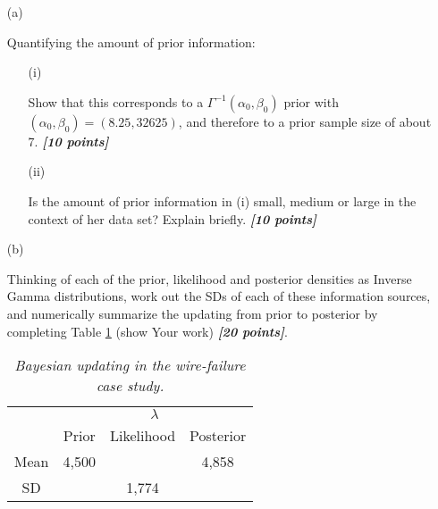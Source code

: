 \documentclass[12pt]{article}
\newcommand{\bi}[1]{\b{\i{#1}}}
\renewcommand{\b}[1]{\textbf{#1}}
\renewcommand{\i}[1]{\textit{#1}}
\begin{document}
\begin{itemize}
\begin{itemize}
\begin{itemize}

\item[(a)] 

Quantifying the amount of prior information:

\begin{itemize}

\item[(i)]

Show that this corresponds to a $\Gamma^{ -1 }( \alpha_0, \beta_0 )$
prior with $( \alpha_0, \beta_0 ) = ( 8.25, 32625 )$, and therefore to a
prior sample size of about 7. \bi{[10 points]}

\item[(ii)]

Is the amount of prior information in (i) small, medium or large in the context of her data set? Explain briefly. \bi{[10 points]}

\end{itemize}

\item[(b)] 

Thinking of each of the prior, likelihood and posterior densities as Inverse Gamma distributions, work out the SDs of each of these information sources, and numerically summarize 	the updating from prior to posterior by completing Table \ref{t:prior-likelihood-posterior} (show Your work) \bi{[20 points]}.

\begin{table}[t!]

\centering

\caption{\textit{Bayesian updating in the wire-failure case study.}}

\label{t:prior-likelihood-posterior}

\bigskip

\begin{tabular}{c|ccc}

\multicolumn{1}{c}{} & \multicolumn{3}{c}{$\lambda$} \\ \cline{2-4}

\multicolumn{1}{c}{} & Prior & Likelihood & Posterior \\

\hline

Mean & 4,500 & & 4,858 \\

SD & & 1,774 & \\

\end{tabular}


\end{table}
\end{itemize}
\end{itemize}
\end{itemize}
\end{document}

